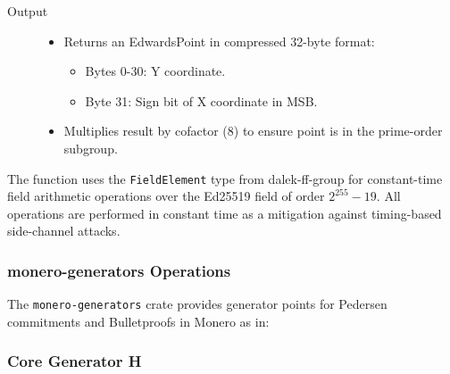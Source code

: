 \begin{description}
\item[Output] \hfill 

\begin{itemize}
\item Returns an EdwardsPoint in compressed 32-byte format:  %
  \begin{itemize}
  \item Bytes 0-30: Y coordinate.  
  \item Byte 31: Sign bit of X coordinate in MSB.  %
  \end{itemize}
\item Multiplies result by cofactor (8) to ensure point is in the prime-order subgroup.  %
\end{itemize}

\end{description}

The function uses the \texttt{FieldElement} type from dalek-ff-group for constant-time field arithmetic operations over the Ed25519 field of order $2^{255} - 19$.  All operations are performed in constant time as a mitigation against timing-based side-channel attacks.  

\subsubsection{monero-generators Operations}

The \texttt{monero-generators} crate provides generator points for Pedersen commitments and Bulletproofs in Monero as in:

\subsubsection{Core Generator H}

